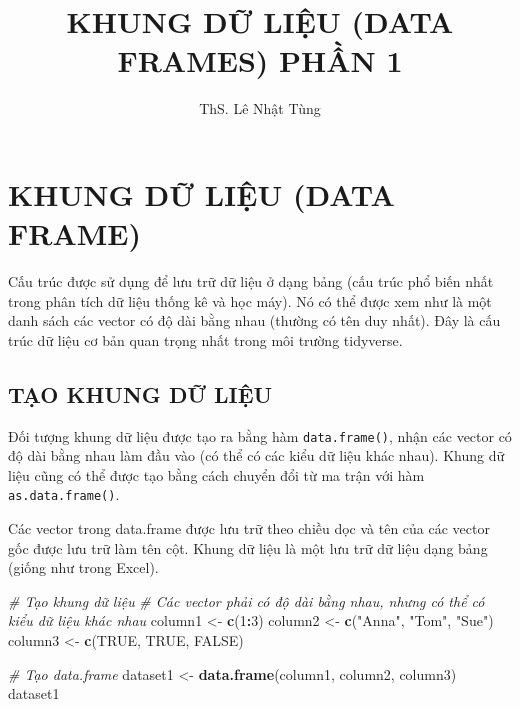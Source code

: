\documentclass[
]{article}
\title{KHUNG DỮ LIỆU (DATA FRAMES) PHẦN 1}
\author{ThS. Lê Nhật Tùng}
\date{}
\newenvironment{Shaded}{\begin{snugshade}}{\end{snugshade}}
\newcommand{\CommentTok}[1]{\textcolor[rgb]{0.56,0.35,0.01}{\textit{#1}}}
\newcommand{\ConstantTok}[1]{\textcolor[rgb]{0.56,0.35,0.01}{#1}}
\newcommand{\DecValTok}[1]{\textcolor[rgb]{0.00,0.00,0.81}{#1}}
\newcommand{\FunctionTok}[1]{\textcolor[rgb]{0.13,0.29,0.53}{\textbf{#1}}}
\newcommand{\NormalTok}[1]{#1}
\newcommand{\OtherTok}[1]{\textcolor[rgb]{0.56,0.35,0.01}{#1}}
\newcommand{\SpecialCharTok}[1]{\textcolor[rgb]{0.81,0.36,0.00}{\textbf{#1}}}
\newcommand{\StringTok}[1]{\textcolor[rgb]{0.31,0.60,0.02}{#1}}
\begin{document}
\maketitle

{
\setcounter{tocdepth}{2}
\tableofcontents
}
\section{KHUNG DỮ LIỆU (DATA
FRAME)}\label{khung-dux1eef-liux1ec7u-data-frame}

Cấu trúc được sử dụng để lưu trữ dữ liệu ở dạng bảng (cấu trúc phổ biến
nhất trong phân tích dữ liệu thống kê và học máy). Nó có thể được xem
như là một danh sách các vector có độ dài bằng nhau (thường có tên duy
nhất). Đây là cấu trúc dữ liệu cơ bản quan trọng nhất trong môi trường
tidyverse.

\subsection{TẠO KHUNG DỮ LIỆU}\label{tux1ea1o-khung-dux1eef-liux1ec7u}

Đối tượng khung dữ liệu được tạo ra bằng hàm \texttt{data.frame()}, nhận
các vector có độ dài bằng nhau làm đầu vào (có thể có các kiểu dữ liệu
khác nhau). Khung dữ liệu cũng có thể được tạo bằng cách chuyển đổi từ
ma trận với hàm \texttt{as.data.frame()}.

Các vector trong data.frame được lưu trữ theo chiều dọc và tên của các
vector gốc được lưu trữ làm tên cột. Khung dữ liệu là một lưu trữ dữ
liệu dạng bảng (giống như trong Excel).

\begin{Shaded}
\begin{Highlighting}[]
\CommentTok{\# Tạo khung dữ liệu}
\CommentTok{\# Các vector phải có độ dài bằng nhau, nhưng có thể có kiểu dữ liệu khác nhau}
\NormalTok{column1 }\OtherTok{\textless{}{-}} \FunctionTok{c}\NormalTok{(}\DecValTok{1}\SpecialCharTok{:}\DecValTok{3}\NormalTok{)}
\NormalTok{column2 }\OtherTok{\textless{}{-}} \FunctionTok{c}\NormalTok{(}\StringTok{"Anna"}\NormalTok{, }\StringTok{"Tom"}\NormalTok{, }\StringTok{"Sue"}\NormalTok{)}
\NormalTok{column3 }\OtherTok{\textless{}{-}} \FunctionTok{c}\NormalTok{(}\ConstantTok{TRUE}\NormalTok{, }\ConstantTok{TRUE}\NormalTok{, }\ConstantTok{FALSE}\NormalTok{)}

\CommentTok{\# Tạo data.frame}
\NormalTok{dataset1 }\OtherTok{\textless{}{-}} \FunctionTok{data.frame}\NormalTok{(column1, column2, column3)}
\NormalTok{dataset1}
\end{Highlighting}
\end{Shaded}
\end{document}
